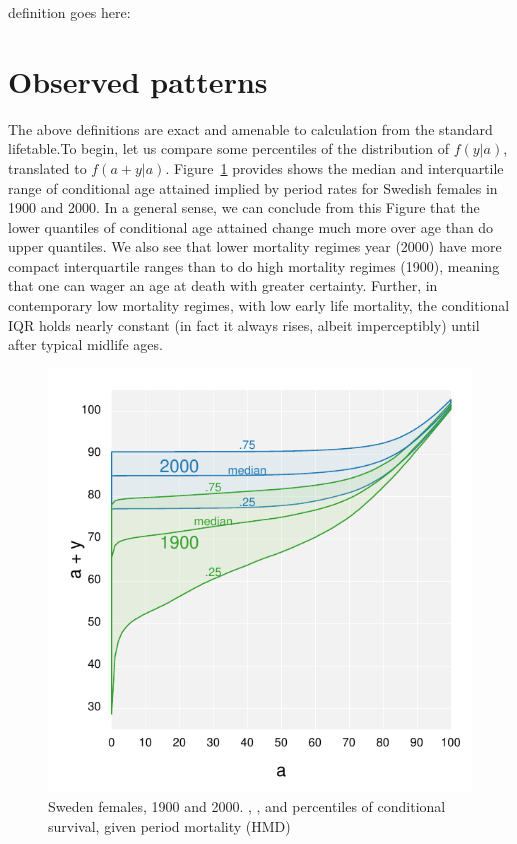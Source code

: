 \documentclass{article}
\begin{document}
definition goes here:

\section{Observed patterns}
The above definitions are exact and amenable to calculation from
the standard lifetable.To begin, let us
compare some percentiles of the distribution of $f(y|a)$, translated to
$f(a+y|a)$. Figure~\ref{fig:IQR1} provides shows the median and interquartile
range of conditional age attained implied by period rates for Swedish females in
1900 and 2000. In a general sense, we can conclude from this Figure that the
lower quantiles of conditional age attained change much more over age than do
upper quantiles. We also see that lower mortality regimes year (2000) have more
compact interquartile ranges than to do high mortality regimes (1900), meaning
that one can wager an age at death with greater certainty. Further, in
contemporary low mortality regimes, with low early life mortality, the
conditional IQR holds nearly constant (in fact it always rises, albeit
imperceptibly) until after typical midlife ages.
\begin{figure}[h!]
\centering
	\caption{Sweden females, 1900 and 2000. , , and 
	percentiles of conditional survival, given period mortality (HMD)}
	\label{fig:IQR1}
	\includegraphics[scale=.7]{Figures/SwedenFemalesIQR1900_2000.pdf}	
\end{figure}
\end{document}
